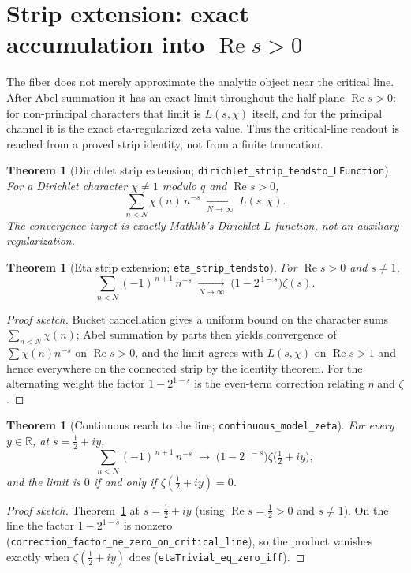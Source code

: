 \documentclass[11pt]{article}
\newtheorem{theorem}[definition]{Theorem}
\DeclareMathOperator{\Ree}{Re}
\newcommand{\R}{\mathbb{R}}
\newcommand{\code}[1]{\texttt{#1}}
\begin{document}
\section{Strip extension: exact accumulation into $\Ree s>0$}\label{sec:strip}

The fiber does not merely approximate the analytic object near the critical line.  After Abel
summation it has an exact limit throughout the half-plane $\Ree s>0$: for non-principal characters
that limit is $L(s,\chi)$ itself, and for the principal channel it is the exact eta-regularized
zeta value.  Thus the critical-line readout is reached from a proved strip identity, not from a
finite truncation.

\begin{theorem}[Dirichlet strip extension; \code{dirichlet\_strip\_tendsto\_LFunction}]\label{thm:dstrip}
For a Dirichlet character $\chi\neq 1$ modulo $q$ and $\Ree s>0$,
\[
  \sum_{n<N}\chi(n)\,n^{-s}\;\xrightarrow[N\to\infty]{}\;L(s,\chi).
\]
The convergence target is exactly Mathlib's Dirichlet $L$-function, not an auxiliary regularization.
\end{theorem}

\begin{theorem}[Eta strip extension; \code{eta\_strip\_tendsto}]\label{thm:etastrip}
For $\Ree s>0$ and $s\neq 1$,
\[
  \sum_{n<N}(-1)^{\,n+1}\,n^{-s}\;\xrightarrow[N\to\infty]{}\;\bigl(1-2^{\,1-s}\bigr)\zeta(s).
\]
\end{theorem}

\begin{proof}[Proof sketch]
Bucket cancellation gives a uniform bound on the character sums $\sum_{n<N}\chi(n)$; Abel summation
by parts \cite{Apostol1976,Titchmarsh1986} then yields convergence of $\sum\chi(n)n^{-s}$ on
$\Ree s>0$, and the limit agrees with
$L(s,\chi)$ on $\Ree s>1$ and hence everywhere on the connected strip by the identity theorem. For
the alternating weight the factor $1-2^{1-s}$ is the even-term correction relating $\eta$ and $\zeta$.
\end{proof}

\begin{theorem}[Continuous reach to the line; \code{continuous\_model\_zeta}]\label{thm:cont}
For every $y\in\R$, at $s=\tfrac12+iy$,
\[
  \sum_{n<N}(-1)^{\,n+1}\,n^{-s}\;\longrightarrow\;\bigl(1-2^{\,1-s}\bigr)\zeta\!\bigl(\tfrac12+iy\bigr),
\]
and the limit is $0$ if and only if $\zeta(\tfrac12+iy)=0$.
\end{theorem}

\begin{proof}[Proof sketch]
Theorem~\ref{thm:etastrip} at $s=\tfrac12+iy$ (using $\Ree s=\tfrac12>0$ and $s\neq1$). On the line
the factor $1-2^{1-s}$ is nonzero (\code{correction\_factor\_ne\_zero\_on\_critical\_line}), so the
product vanishes exactly when $\zeta(\tfrac12+iy)$ does (\code{etaTrivial\_eq\_zero\_iff}).
\end{proof}
\end{document}
